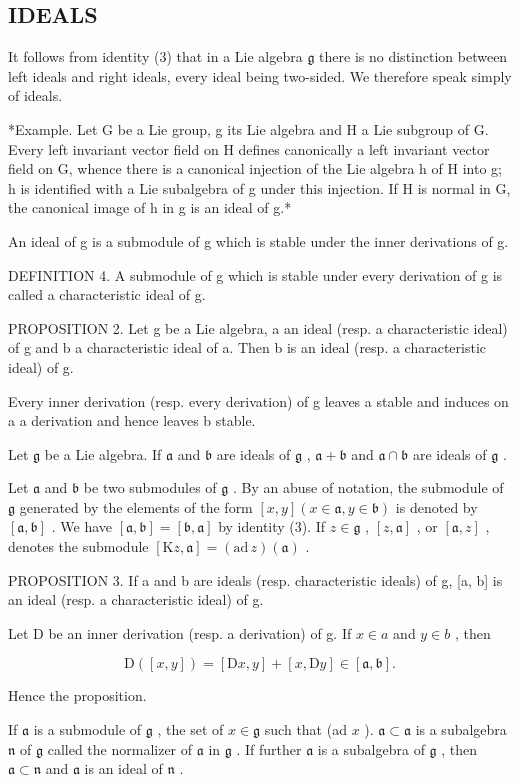 \subsection{IDEALS}

It follows from identity (3) that in a Lie algebra \(\mathfrak{g}\) there is no distinction between left ideals and right ideals, every ideal being two-sided. We therefore speak simply of ideals.

*Example. Let G be a Lie group, g its Lie algebra and H a Lie subgroup of G. Every left invariant vector field on H defines canonically a left invariant vector field on G, whence there is a canonical injection of the Lie algebra h of H into g; h is identified with a Lie subalgebra of g under this injection. If H is normal in G, the canonical image of h in g is an ideal of g.*

An ideal of g is a submodule of g which is stable under the inner derivations of g.

DEFINITION 4. A submodule of g which is stable under every derivation of g is called a characteristic ideal of g.

PROPOSITION 2. Let g be a Lie algebra, a an ideal (resp. a characteristic ideal) of g and b a characteristic ideal of a. Then b is an ideal (resp. a characteristic ideal) of g.

Every inner derivation (resp. every derivation) of g leaves a stable and induces on a a derivation and hence leaves b stable.

Let \(\mathfrak{g}\) be a Lie algebra. If \(\mathfrak{a}\) and \(\mathfrak{b}\) are ideals of \(\mathfrak{g}\) , \(\mathfrak{a} + \mathfrak{b}\) and \(\mathfrak{a} \cap \mathfrak{b}\) are ideals of \(\mathfrak{g}\) .

Let \(\mathfrak{a}\) and \(\mathfrak{b}\) be two submodules of \(\mathfrak{g}\) . By an abuse of notation, the submodule of \(\mathfrak{g}\) generated by the elements of the form \([x,y](x\in\mathfrak{a},y\in\mathfrak{b})\) is denoted by \([\mathfrak{a},\mathfrak{b}]\) . We have \([\mathfrak{a},\mathfrak{b}] = [\mathfrak{b},\mathfrak{a}]\) by identity (3). If \(z\in\mathfrak{g}\) , \([z,\mathfrak{a}]\) , or \([\mathfrak{a},z]\) , denotes the submodule \([\mathrm{K}z,\mathfrak{a}] = (\mathrm{ad}\,z)(\mathfrak{a})\) .

PROPOSITION 3. If a and b are ideals (resp. characteristic ideals) of g, {[}a, b{]} is an ideal (resp. a characteristic ideal) of g.

Let D be an inner derivation (resp. a derivation) of g. If \(x \in a\) and \(y \in b\) , then

\[
\mathrm{D} ([ x, y ]) = [ \mathrm{D} x, y ] + [ x, \mathrm{D} y ] \in [ \mathfrak {a}, \mathfrak {b} ].
\]

Hence the proposition.

If \(\mathfrak{a}\) is a submodule of \(\mathfrak{g}\) , the set of \(x \in \mathfrak{g}\) such that (ad \(x\) ). \(\mathfrak{a} \subset \mathfrak{a}\) is a subalgebra \(\mathfrak{n}\) of \(\mathfrak{g}\) called the normalizer of \(\mathfrak{a}\) in \(\mathfrak{g}\) . If further \(\mathfrak{a}\) is a subalgebra of \(\mathfrak{g}\) , then \(\mathfrak{a} \subset \mathfrak{n}\) and \(\mathfrak{a}\) is an ideal of \(\mathfrak{n}\) .

